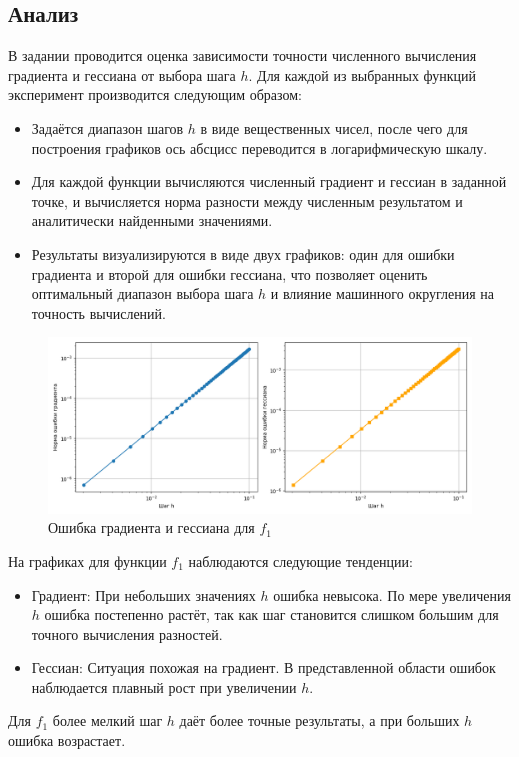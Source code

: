 \documentclass[a4paper,12pt]{article}
\begin{document}
\subsection{Анализ}
В задании проводится оценка зависимости точности численного вычисления градиента и гессиана от выбора шага \( h \). Для каждой из выбранных функций эксперимент производится следующим образом:
\begin{itemize}
    \item Задаётся диапазон шагов \( h \) в виде вещественных чисел, после чего для построения графиков ось абсцисс переводится в логарифмическую шкалу.
    \item Для каждой функции вычисляются численный градиент и гессиан в заданной точке, и вычисляется норма разности между численным результатом и аналитически найденными значениями.
    \item Результаты визуализируются в виде двух графиков: один для ошибки градиента и второй для ошибки гессиана, что позволяет оценить оптимальный диапазон выбора шага \( h \) и влияние машинного округления на точность вычислений.
\end{itemize}
\begin{figure}[H]
    \centering \includegraphics[width=\textwidth]{images/1_f1.png}
    \caption{Ошибка градиента и гессиана для $f_1$}
\end{figure}
\noindent На графиках для функции \( f_1 \) наблюдаются следующие тенденции:
\begin{itemize}
    \item Градиент: При небольших значениях \(h\) ошибка невысока. По мере увеличения \(h\) ошибка постепенно растёт, так как шаг становится слишком большим для точного вычисления разностей.
    \item Гессиан: Ситуация похожая на градиент. В представленной области ошибок наблюдается плавный рост при увеличении \(h\).
\end{itemize}
Для \(f_1\) более мелкий шаг \(h\) даёт более точные результаты, а при больших \(h\) ошибка возрастает.
\end{document}

